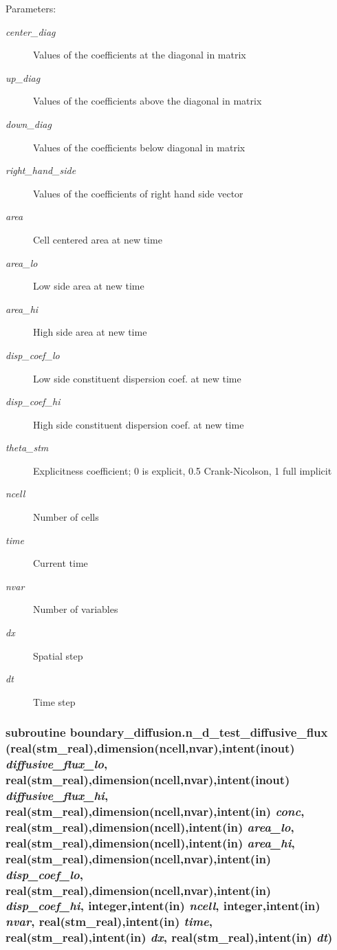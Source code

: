 \begin{Desc}
\item[Parameters:]
\begin{description}
\item[{\em center\_\-diag}]Values of the coefficients at the diagonal in matrix\item[{\em up\_\-diag}]Values of the coefficients above the diagonal in matrix\item[{\em down\_\-diag}]Values of the coefficients below diagonal in matrix\item[{\em right\_\-hand\_\-side}]Values of the coefficients of right hand side vector\item[{\em area}]Cell centered area at new time \item[{\em area\_\-lo}]Low side area at new time\item[{\em area\_\-hi}]High side area at new time \item[{\em disp\_\-coef\_\-lo}]Low side constituent dispersion coef. at new time\item[{\em disp\_\-coef\_\-hi}]High side constituent dispersion coef. at new time\item[{\em theta\_\-stm}]Explicitness coefficient; 0 is explicit, 0.5 Crank-Nicolson, 1 full implicit \item[{\em ncell}]Number of cells\item[{\em time}]Current time\item[{\em nvar}]Number of variables\item[{\em dx}]Spatial step \item[{\em dt}]Time step \end{description}
\end{Desc}
\hypertarget{a00054_a9e96b1c553b05d9fc8c3ee7645844bf}{
\subsubsection[{n\_\-d\_\-test\_\-diffusive\_\-flux}]{\setlength{\rightskip}{0pt plus 5cm}subroutine boundary\_\-diffusion.n\_\-d\_\-test\_\-diffusive\_\-flux (real(stm\_\-real),dimension(ncell,nvar),intent(inout) {\em diffusive\_\-flux\_\-lo}, \/  real(stm\_\-real),dimension(ncell,nvar),intent(inout) {\em diffusive\_\-flux\_\-hi}, \/  real(stm\_\-real),dimension(ncell,nvar),intent(in) {\em conc}, \/  real(stm\_\-real),dimension(ncell),intent(in) {\em area\_\-lo}, \/  real(stm\_\-real),dimension(ncell),intent(in) {\em area\_\-hi}, \/  real(stm\_\-real),dimension(ncell,nvar),intent(in) {\em disp\_\-coef\_\-lo}, \/  real(stm\_\-real),dimension(ncell,nvar),intent(in) {\em disp\_\-coef\_\-hi}, \/  integer,intent(in) {\em ncell}, \/  integer,intent(in) {\em nvar}, \/  real(stm\_\-real),intent(in) {\em time}, \/  real(stm\_\-real),intent(in) {\em dx}, \/  real(stm\_\-real),intent(in) {\em dt})}}
\label{a00054_a9e96b1c553b05d9fc8c3ee7645844bf}



